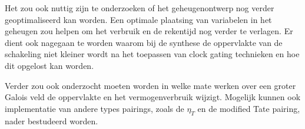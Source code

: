 Het zou ook nuttig zijn te onderzoeken of het geheugenontwerp nog verder geoptimaliseerd kan worden. Een optimale plaatsing van variabelen in het geheugen zou helpen om het verbruik en de rekentijd nog verder te verlagen. Er dient ook nagegaan te worden waarom bij de synthese de oppervlakte van de schakeling niet kleiner wordt na het toepassen van clock gating technieken en hoe dit opgelost kan worden.

Verder zou ook onderzocht moeten worden in welke mate werken over een groter Galois veld de oppervlakte en het vermogenverbruik wijzigt. Mogelijk kunnen ook implementatie van andere types pairings, zoals de $\eta_T$ en de modified Tate pairing, nader bestudeerd worden.

